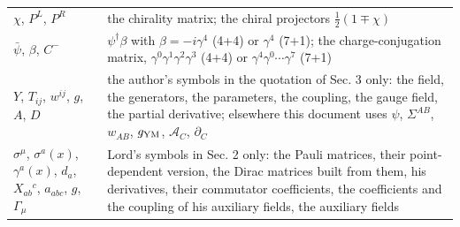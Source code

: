 \documentclass[
  10pt,
]{article}
\begin{document}
\begin{longtable}[]{@{}
  >{\raggedright\arraybackslash}p{}
  >{\raggedright\arraybackslash}p{}@{}}
\(\chi\), \(P^L\), \(P^R\) & the chirality matrix; the chiral projectors
\(\tfrac12(1\mp\chi)\) \\
\(\bar\psi\), \(\beta\), \(C^-\) & \(\psi^\dagger\beta\) with
\(\beta=-i\gamma^{4}\) (4+4) or \(\gamma^{4}\) (7+1); the
charge-conjugation matrix, \(\gamma^{0}\gamma^{1}\gamma^{2}\gamma^{3}\)
(4+4) or \(\gamma^{4}\gamma^{0}\cdots\gamma^{7}\) (7+1) \\
\(Y\), \(T_{ij}\), \(w^{ij}\), \(g\), \(A\), \(D\) & the author's
symbols in the quotation of Sec. 3 only: the field, the generators, the
parameters, the coupling, the gauge field, the partial derivative;
elsewhere this document uses \(\psi\), \(\Sigma^{AB}\), \(w_{AB}\),
\(g_{\rm YM}\), \(\mathcal A_C\), \(\partial_C\) \\
\(\sigma^\mu\), \(\sigma^a(x)\), \(\gamma^a(x)\), \(d_a\),
\(X_{ab}{}^c\), \(a_{abc}\), \(g\), \(\Gamma_\mu\) & Lord's symbols in
Sec. 2 only: the Pauli matrices, their point-dependent version, the
Dirac matrices built from them, his derivatives, their commutator
coefficients, the coefficients and the coupling of his auxiliary fields,
the auxiliary fields \\
\end{longtable}
\end{document}
